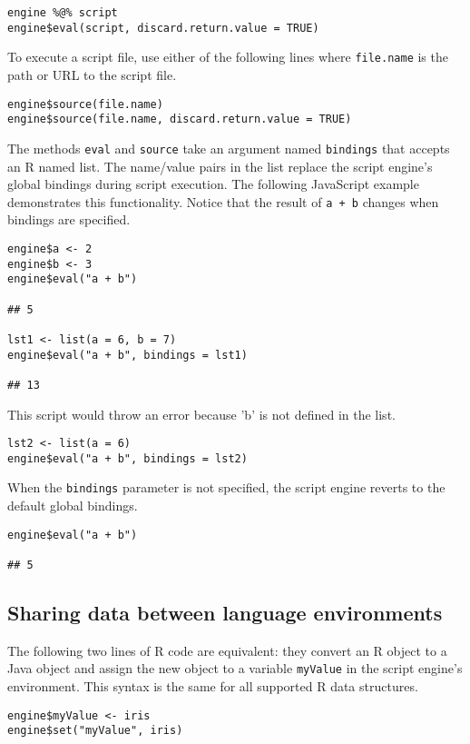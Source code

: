 \documentclass[
article,
11pt, %
a4paper, %
oneside, %
headinclude,footinclude, %
]{scrartcl}
\theoremstyle{definition} %
\theoremstyle{plain} %
\theoremstyle{remark} %
\newcommand{\code}[1]{\texttt{#1}}
\begin{document}
\begin{verbatim}
engine %@% script
engine$eval(script, discard.return.value = TRUE)
\end{verbatim}
To execute a script file, use either of the following lines where \code{file.name} is the path or URL to the script file.

\begin{verbatim}
engine$source(file.name)
engine$source(file.name, discard.return.value = TRUE)
\end{verbatim}

The methods \code{eval} and \code{source} take an argument named \code{bindings} that accepts an R named list. The name/value pairs in the list replace the script engine's global bindings during script execution. The following JavaScript example demonstrates this functionality. Notice that the result of \code{a + b} changes when bindings are specified.

\begin{verbatim}
engine$a <- 2
engine$b <- 3
engine$eval("a + b")

## 5

lst1 <- list(a = 6, b = 7)
engine$eval("a + b", bindings = lst1)

## 13
\end{verbatim}
This script would throw an error because 'b' is not defined in the list.
\begin{verbatim}
lst2 <- list(a = 6)
engine$eval("a + b", bindings = lst2)
\end{verbatim}
When the \code{bindings} parameter is not specified, the script engine reverts to the default global bindings.
\begin{verbatim}
engine$eval("a + b")

## 5
\end{verbatim}

\subsection{Sharing data between language environments}

The following two lines of R code are equivalent: they convert an R object to a Java object and assign the new object to a variable \code{myValue} in the script engine's environment. This syntax is the same for all supported R data structures.

\begin{verbatim}
engine$myValue <- iris
engine$set("myValue", iris)
\end{verbatim}
\end{document}
